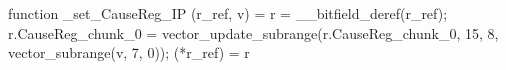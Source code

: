 function _set_CauseReg_IP (r_ref, v) = {
    r = __bitfield_deref(r_ref);
    r.CauseReg_chunk_0 = vector_update_subrange(r.CauseReg_chunk_0, 15, 8, vector_subrange(v, 7, 0));
    (*r_ref) = r
}
